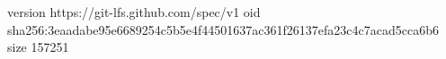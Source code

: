 version https://git-lfs.github.com/spec/v1
oid sha256:3eaadabe95e6689254c5b5e4f44501637ac361f26137efa23c4c7acad5cca6b6
size 157251
